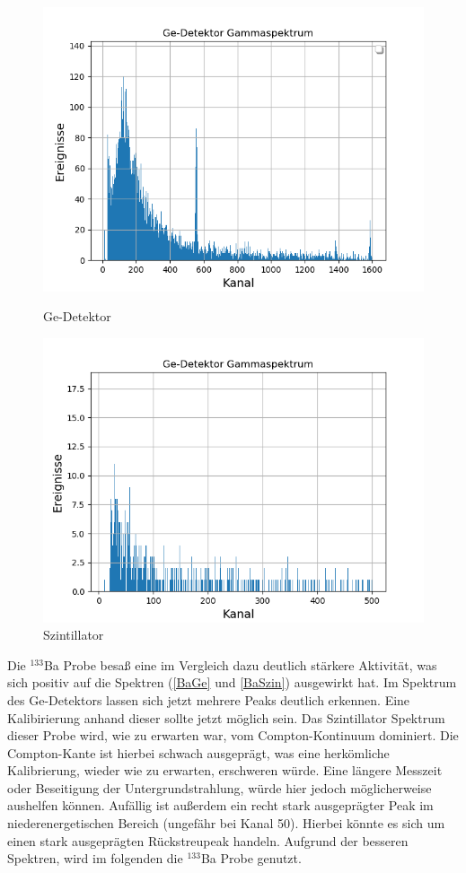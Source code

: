 \begin{figure}[h]
  \includegraphics[width=\linewidth]{images/Na22ge.png}
  \caption{Ge-Detektor}
  \label{NaGe}
\endminipage\hfill
{}
  \includegraphics[width=\linewidth]{images/Na22szin.png}
  \caption{Szintillator}
  \label{NaSzin}
\endminipage\hfill
\end{figure}

Die $^{133}$Ba Probe besaß eine im Vergleich dazu deutlich stärkere Aktivität, was sich positiv auf die Spektren (\ref{BaGe} und \ref{BaSzin}) ausgewirkt hat.
Im Spektrum des Ge-Detektors lassen sich jetzt mehrere Peaks deutlich erkennen.
Eine Kalibirierung anhand dieser sollte jetzt möglich sein.
Das Szintillator Spektrum dieser Probe wird, wie  zu erwarten war, vom Compton-Kontinuum dominiert.
Die Compton-Kante ist hierbei schwach ausgeprägt, was eine herkömliche Kalibrierung, wieder wie zu erwarten, erschweren würde.
Eine längere Messzeit oder Beseitigung der Untergrundstrahlung, würde hier jedoch möglicherweise aushelfen können.
Aufällig ist außerdem ein recht stark ausgeprägter Peak im niederenergetischen Bereich (ungefähr bei Kanal 50).
Hierbei könnte es sich um einen stark ausgeprägten Rückstreupeak handeln.
Aufgrund der besseren Spektren, wird im folgenden die $^{133}$Ba Probe genutzt.

